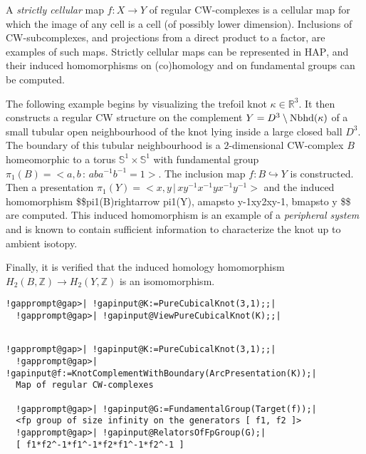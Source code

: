 \documentclass[a4paper,11pt]{report}
\begin{document}
{{A \emph{strictly cellular} map $f\colon X\rightarrow Y$ of regular CW-complexes is a cellular map for which the image of any cell is a
cell (of possibly lower dimension). Inclusions of CW-subcomplexes, and
projections from a direct product to a factor, are examples of such maps.
Strictly cellular maps can be represented in \textsc{HAP}, and their induced homomorphisms on (co)homology and on fundamental groups
can be computed. 

 The following example begins by visualizing the trefoil knot $\kappa \in \mathbb R^3$. It then constructs a regular CW structure on the complement $Y= D^3\setminus {\rm Nbhd}(\kappa) $ of a small tubular open neighbourhood of the knot lying inside a large closed
ball $D^3$. The boundary of this tubular neighbourhood is a $2$-dimensional CW-complex $B$ homeomorphic to a torus $\mathbb S^1\times \mathbb S^1$ with fundamental group $\pi_1(B)=<a,b\, :\, aba^{-1}b^{-1}=1>$. The inclusion map $f\colon B\hookrightarrow Y$ is constructed. Then a presentation $\pi_1(Y)= <x,y\, |\, xy^{-1}x^{-1}yx^{-1}y^{-1}>$ and the induced homomorphism
\$\$\texttt{}pi{\textunderscore}1(B)\texttt{}rightarrow
\texttt{}pi{\textunderscore}1(Y), a\texttt{}mapsto
y\texttt{}\texttt{}-1\texttt{}xy\texttt{}2xy\texttt{}\texttt{}-1\texttt{},
b\texttt{}mapsto y \$\$ are computed. This induced homomorphism is
an example of a \emph{peripheral system} and is known to contain sufficient information to characterize the knot up to
ambient isotopy. 

 Finally, it is verified that the induced homology homomorphism $H_2(B,\mathbb Z) \rightarrow H_2(Y,\mathbb Z)$ is an isomomorphism. 
\begin{Verbatim}[commandchars=!@|,fontsize=\small,frame=single,label=Example]
  !gapprompt@gap>| !gapinput@K:=PureCubicalKnot(3,1);;|
  !gapprompt@gap>| !gapinput@ViewPureCubicalKnot(K);;|
  
\end{Verbatim}
  
\begin{Verbatim}[commandchars=!@|,fontsize=\small,frame=single,label=Example]
  !gapprompt@gap>| !gapinput@K:=PureCubicalKnot(3,1);;|
  !gapprompt@gap>| !gapinput@f:=KnotComplementWithBoundary(ArcPresentation(K));|
  Map of regular CW-complexes
  
  !gapprompt@gap>| !gapinput@G:=FundamentalGroup(Target(f));|
  <fp group of size infinity on the generators [ f1, f2 ]>
  !gapprompt@gap>| !gapinput@RelatorsOfFpGroup(G);|
  [ f1*f2^-1*f1^-1*f2*f1^-1*f2^-1 ]
  

\end{Verbatim}}}
\end{document}
